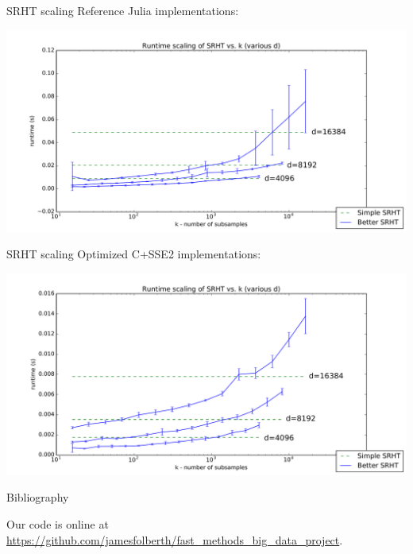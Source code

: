 \documentclass[9pt]{beamer}
\begin{document}
\begin{frame}{SRHT scaling}
    Reference Julia implementations:\\

   \begin{center}
      \includegraphics[width=\textwidth]{figures/srht_julia_ref_k_scaling.pdf}
   \end{center}
\end{frame}

\begin{frame}{SRHT scaling}
   Optimized C+SSE2 implementations:\\

   \begin{center}
      \includegraphics[width=\textwidth]{figures/srht_C_k_scaling.pdf}
   \end{center}
\end{frame}


\begin{frame}[allowframebreaks]{Bibliography}
   
   Our code is online at\\
   {\small\url{https://github.com/jamesfolberth/fast_methods_big_data_project}}.\\




\end{frame}
\end{document}
